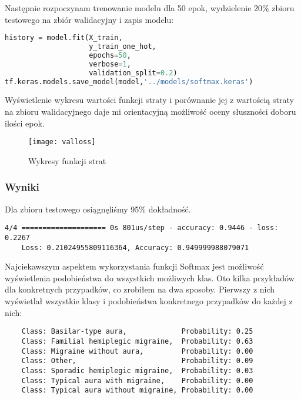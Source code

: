 Następnie rozpoczynam trenowanie modelu dla 50 epok, wydzielenie 20\% zbioru testowego na zbiór walidacyjny i zapis modelu:
\begin{lstlisting}[language=Python, caption=Definicja sieci głębokiej z funkcją aktywacji Softmax]
history = model.fit(X_train,
                    y_train_one_hot,
                    epochs=50,
                    verbose=1,
                    validation_split=0.2)
tf.keras.models.save_model(model,'../models/softmax.keras')
\end{lstlisting}


Wyświetlenie wykresu wartości funkcji straty i porównanie jej z wartością straty na zbioru walidacyjnego daje mi orientacyjną możliwość oceny słuszności doboru ilości epok.\\


\begin{figure}[h]
    \centering
    \texttt{[image: valloss]}
    \caption{Wykresy funkcji strat}
    \label{fig:valloss}
\end{figure}

\subsubsection{Wyniki}
Dla zbioru testowego osiągnęliśmy 95\% dokładność.\\

\begin{verbatim}
4/4 ==================== 0s 801us/step - accuracy: 0.9446 - loss: 0.2267
    Loss: 0.21024955809116364, Accuracy: 0.949999988079071
\end{verbatim}

Najciekawszym aspektem wykorzystania funkcji Softmax jest możliwość wyświetlenia podobieństwa do wszystkich możliwych klas. Oto kilka przykładów dla konkretnych przypadków, co zrobiłem na dwa sposoby. Pierwszy z nich wyświetlał wszystkie klasy i podobieństwa konkretnego przypadków do każdej z nich:\\

\begin{verbatim}
    Class: Basilar-type aura,             Probability: 0.25
    Class: Familial hemiplegic migraine,  Probability: 0.63
    Class: Migraine without aura,         Probability: 0.00
    Class: Other,                         Probability: 0.09
    Class: Sporadic hemiplegic migraine,  Probability: 0.03
    Class: Typical aura with migraine,    Probability: 0.00
    Class: Typical aura without migraine, Probability: 0.00
\end{verbatim}

